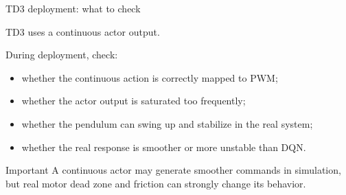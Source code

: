 \documentclass[aspectratio=169]{beamer}
\begin{document}
\begin{frame}{TD3 deployment: what to check}

TD3 uses a continuous actor output.

\vspace{0.18cm}

During deployment, check:

\begin{itemize}
    \item whether the continuous action is correctly mapped to PWM;
    \vspace{0.18cm}

    \item whether the actor output is saturated too frequently;
    \vspace{0.18cm}

    \item whether the pendulum can swing up and stabilize in the real system;
    \vspace{0.18cm}

    \item whether the real response is smoother or more unstable than DQN.
\end{itemize}

\vspace{0.15cm}

\begin{alertblock}{Important}
\small
A continuous actor may generate smoother commands in simulation, but real motor dead zone and friction can strongly change its behavior.
\end{alertblock}

\end{frame}
\end{document}
